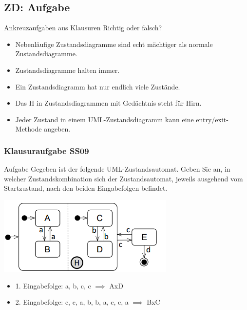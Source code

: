 \documentclass[18pt]{beamer}
\newcommand{\cmark}{\ding{51}}%
\newcommand{\xmark}{\ding{55}}%
\begin{document}
	\subsection{ZD: Aufgabe}
	
\begin{frame}{Ankreuzaufgaben aus Klausuren}
Richtig oder falsch?
	\begin{itemize}
		\item Nebenläufige Zustandsdiagramme sind echt mächtiger als normale Zustandsdiagramme.\pause ~\textcolor{red}{\xmark}
		\item Zustandsdiagramme halten immer.\pause ~\textcolor{red}{\xmark}
		\item Ein Zustandsdiagramm hat nur endlich viele Zustände.
\pause ~\textcolor{green}{\cmark}
		\item Das 
H in Zustandsdiagrammen mit Gedächtnis steht für Hirn.
\pause ~\textcolor{red}{\xmark}
		\item Jeder Zustand in einem UML-Zustandsdiagramm kann eine entry/exit-Methode angeben. \pause ~\textcolor{green}{\cmark}
	\end{itemize}
\end{frame}
	
	\begin{frame}
		\frametitle{Klausuraufgabe SS09}
		\begin{block}{Aufgabe}
			Gegeben ist der folgende UML-Zustandsautomat. Geben Sie an, in welcher Zustandskombination
			sich der Zustandsautomat, jeweils ausgehend vom Startzustand, nach den beiden Eingabefolgen
			befindet.
		\end{block}
		\centering
		\includegraphics[scale=0.7]{./pics/tut2/auto_ex.png}
		\begin{itemize}
			\item 1. Eingabefolge: a, b, c, c \pause $\implies$ AxD
			\item 2. Eingabefolge: c, c, a, b, b, a, c, c, a \pause $\implies$ BxC
		\end{itemize}
	\end{frame}
\end{document}
